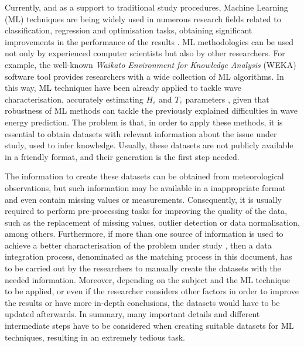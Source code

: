 \documentclass[review]{elsarticle}
\begin{document}
		Currently, and as a support to traditional study procedures, Machine Learning (ML) techniques \cite{Alpaydin:2004:IML:1036287,Bishop:2006:PRM:1162264} are being widely used in numerous research fields related to classification, regression and optimisation tasks, obtaining significant improvements in the performance of the results \cite{DELFANI2019100559,NASRUDDIN201948,GUO201816}. ML methodologies can be used not only by experienced computer scientists but also by other researchers. For example, the well-known \textit{Waikato Environment for Knowledge Analysis} (WEKA) \cite{WEKA} software tool provides researchers with a wide collection of ML algorithms. In this way, ML techniques have been already applied to tackle wave characterisation, accurately estimating $H_{s}$ and $T_{e}$ parameters \cite{DURANROSAL2017268, KUMAR2017605}, given that robustness of ML methods can tackle the previously explained difficulties in wave energy prediction. The problem is that, in order to apply these methods, it is essential to obtain datasets with relevant information about the issue under study, used to infer knowledge. Usually, these datasets are not publicly available in a friendly format, and their generation is the first step needed.

		The information to create these datasets can be obtained from meteorological observations, but such information may be available in a inappropriate format and even contain missing values or measurements. Consequently, it is usually required to perform pre-processing tasks for improving the quality of the data, such as the replacement of missing values, outlier detection or data normalisation, among others. Furthermore, if more than one source of information is used to achieve a better characterisation of the problem under study \cite{JOHANSSON2015143, FERNANDEZ201544, Adams2010}, then a data integration process, denominated as the matching process in this document, has to be carried out by the researchers to manually create the datasets with the needed information. Moreover, depending on the subject and the ML technique to be applied, or even if the researcher considers other factors in order to improve the results or have more in-depth conclusions, the datasets would have to be updated afterwards. In summary, many important details and different intermediate steps have to be considered when creating suitable datasets for ML techniques, resulting in an extremely tedious task.
\end{document}
